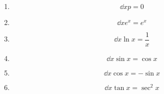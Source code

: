 \begin{enumerate}[]
	\item \begin{equation*}
	\dd{x} p = 0
	\end{equation*}
	\item \begin{equation*}
	\dd{x} e^x = e^x
	\end{equation*}
	\item \begin{equation*}
	\dd{x} \ln{x} = \frac{1}{x}
	\end{equation*}
	\item \begin{equation*}
	\dd{x} \sin{x} = \cos{x}
	\end{equation*}
	\item \begin{equation*}
	\dd{x} \cos{x} = -\sin{x}
	\end{equation*}
	\item \begin{equation*}
	\dd{x} \tan{x} = \sec^2{x}
	\end{equation*}
\end{enumerate}